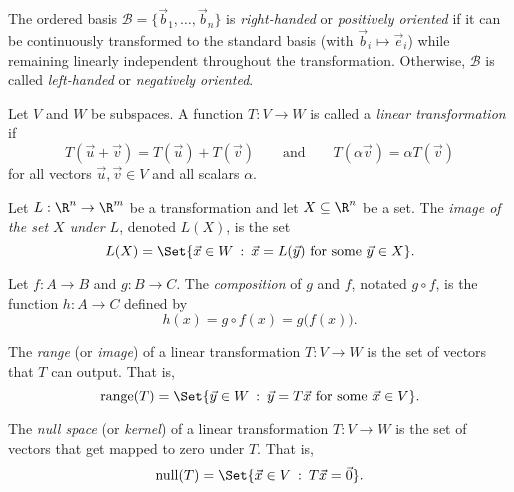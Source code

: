 \begin{SaveDefinition}[key=OrientationofaBasis, title={Orientation of a Basis}]
	The ordered basis $\mathcal B=\{\vec b_{1},\ldots,\vec b_{n}\}$ is
	\emph{right-handed} or
	\emph{positively oriented} if it can be continuously transformed to the
	standard basis (with $\vec b_{i}\mapsto \vec e_{i}$) while remaining
	linearly independent throughout the transformation. Otherwise,
	$\mathcal B$ is called
	\emph{left-handed} or
	\emph{negatively oriented}.
\end{SaveDefinition}

\begin{SaveDefinition}[key=LinearTransformation, title={Linear Transformation}]
	Let $V$ and $W$ be subspaces. A function $T:V\to W$ is called a
	\emph{linear transformation} if
	\[
		T(\vec u+\vec v)=T(\vec u)+T(\vec v) \qquad\text{and}\qquad T(\alpha
		\vec v)=\alpha T(\vec v)
	\]
	 for all vectors $\vec u,\vec v\in V$ and all scalars $\alpha$.
\end{SaveDefinition}

\begin{SaveDefinition}[key=ImageofaSet, title={Image of a Set}]
	Let $L:\R^n\to \R^m$ be a transformation and let $X\subseteq \R^n$ be a set. The
	\emph{image of the set $X$ under $L$}, denoted $L(X)$, is the set
	\[
		L(X)=\Set{\vec x\in W \given \vec x=L(\vec y)\text{ for some }\vec
		y\in X}.
	\]

\end{SaveDefinition}

\begin{SaveDefinition}[key=CompositionofFunctions, title={Composition of Functions}]
	Let $f:A\to B$ and $g:B\to C$. The \emph{composition} of $g$ and $f$, notated $g\circ f$,
	is the function $h:A\to C$ defined by
	\[
		h(x)=g\circ f(x) = g\Big(f(x)\Big).
	\]
\end{SaveDefinition}

\begin{SaveDefinition}[key=Range, title={Range}]
	The
	\emph{range} (or
	\emph{image}) of a linear transformation $T:V\to W$ is the set of vectors
	that $T$ can output. That is,
	\[
		\Range(T)=\Set{\vec y\in W \given \vec y=T\vec x\text{ for some }\vec
		x\in V}.
	\]

\end{SaveDefinition}

\begin{SaveDefinition}[key=NullSpace, title={Null Space}]
	The
	\emph{null space} (or
	\emph{kernel}) of a linear transformation $T:V\to W$ is the set of vectors
	that get mapped to zero under $T$. That is,
	\[
		\Null(T)=\Set{\vec x\in V \given T\vec x=\vec 0}.
	\]

\end{SaveDefinition}

